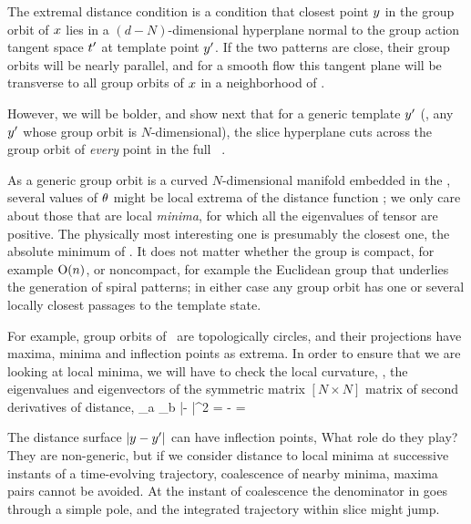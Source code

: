 \documentclass[aip,cha,graphicx]{revtex4-1}
\begin{document}
The extremal distance condition  is a condition that
closest point $y$ in the group orbit of $x$ lies in a
$(d\!-\!N)$-dimensional hyperplane normal to the group action tangent
space $t'_{}$ at template point ${y'}$. If the two patterns are
close, their group orbits will be nearly parallel, and for a smooth flow
this tangent plane will be transverse to all group orbits of $x$ in a
neighborhood of \slicep.

However, we will be bolder, and show next that for a generic template ${y'}$ (\ie, any ${y'}$ whose group orbit is $N$-dimensional), the slice hyperplane  cuts across the group orbit of {\em every} point in the full \statesp\ \pS.


As a generic group orbit is a curved $N$-dimensional manifold embedded in
the \statesp, several values of ${\bf \theta}$ might be local extrema of the
distance function ; we only care about those that are
local {\em minima}, for which all the eigenvalues of tensor
 are positive. The physically most interesting one is
presumably the closest one, the absolute minimum of .
It does not matter whether the group is compact, for example $\textrm{O}(n)$, or
noncompact, for example the Euclidean group that underlies the generation
of spiral patterns; in either case any group orbit has
one or several locally closest passages to the template state.

For
example, group orbits of \ are topologically circles, and their
projections have maxima, minima and inflection points as extrema.
In order to ensure that we are looking at local minima, we will have to
check the local curvature, \ie, the eigenvalues and eigenvectors of the
symmetric matrix $[N\!\times\!N]$ matrix of second derivatives
of distance,
\beq
{}
     {\partial \gSpace_a \partial \gSpace_b}
        |\sspRed - \slicep|^2
    =
  - =


The distance surface $|y - {y'}|$ can have inflection points,
What role do they play? They are non-generic, but if we consider distance
to local minima at successive instants of a time-evolving trajectory,
coalescence of
nearby minima, maxima pairs cannot be avoided. At the instant of
coalescence the denominator in  goes through a simple
pole, and the integrated trajectory within slice might jump.
\end{document}
